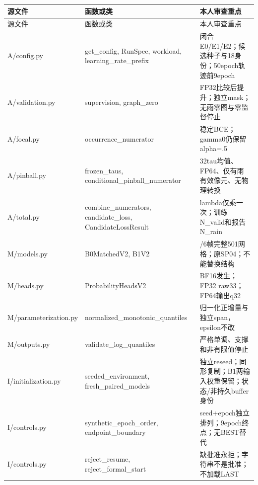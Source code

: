 \documentclass[UTF8,fontset=fandol,10pt]{ctexart}
\begin{document}
\begingroup\small\setlength{\tabcolsep}{3pt}\renewcommand{\arraystretch}{1.12}
\begin{longtable}{>{\raggedright\arraybackslash}p{\dimexpr(\linewidth-6\tabcolsep)/3\relax}>{\raggedright\arraybackslash}p{\dimexpr(\linewidth-6\tabcolsep)/3\relax}>{\raggedright\arraybackslash}p{\dimexpr(\linewidth-6\tabcolsep)/3\relax}}
\toprule
源文件 & 函数或类 & 本人审查重点 \\
\midrule\endfirsthead
源文件 & 函数或类 & 本人审查重点 \\
\midrule\endhead
A/\allowbreak{}config.py & get\_\allowbreak{}config, RunSpec, workload, learning\_\allowbreak{}rate\_\allowbreak{}prefix & 闭合E0/\allowbreak{}E1/\allowbreak{}E2；候选种子与18身份；50epoch轨迹前9epoch \\
A/\allowbreak{}validation.py & supervision, graph\_\allowbreak{}zero & FP32比较后提升；独立mask；无雨零图与零监督停止 \\
A/\allowbreak{}focal.py & occurrence\_\allowbreak{}numerator & 稳定BCE；gamma0仍保留alpha=.5 \\
A/\allowbreak{}pinball.py & frozen\_\allowbreak{}taus, conditional\_\allowbreak{}pinball\_\allowbreak{}numerator & 32tau均值、FP64、仅有雨有效像元、无物理转换 \\
A/\allowbreak{}total.py & combine\_\allowbreak{}numerators, candidate\_\allowbreak{}loss, CandidateLossResult & lambda仅乘一次；训练N\_\allowbreak{}valid和报告N\_\allowbreak{}rain \\
M/\allowbreak{}models.py & B0MatchedV2, B1V2 & 1/\allowbreak{}6帧完整501网格；原SP04；不能替换结构 \\
M/\allowbreak{}heads.py & ProbabilityHeadsV2 & BF16发生；FP32 raw33；FP64输出q32 \\
M/\allowbreak{}parameterization.py & normalized\_\allowbreak{}monotonic\_\allowbreak{}quantiles & 归一化正增量与独立span，epsilon不改 \\
M/\allowbreak{}outputs.py & validate\_\allowbreak{}log\_\allowbreak{}quantiles & 严格单调、支撑和非有限值停止 \\
I/\allowbreak{}initialization.py & seeded\_\allowbreak{}environment, fresh\_\allowbreak{}paired\_\allowbreak{}models & 独立reseed；同形复制；B1两输入权重保留；状态/\allowbreak{}非持久buffer身份 \\
I/\allowbreak{}controls.py & synthetic\_\allowbreak{}epoch\_\allowbreak{}order, endpoint\_\allowbreak{}boundary & seed+epoch独立排列；9epoch终点；无BEST替代 \\
I/\allowbreak{}controls.py & reject\_\allowbreak{}resume, reject\_\allowbreak{}formal\_\allowbreak{}start & 缺批准永拒；字符串不是批准；不加载LAST \\

\end{longtable}
\end{document}
